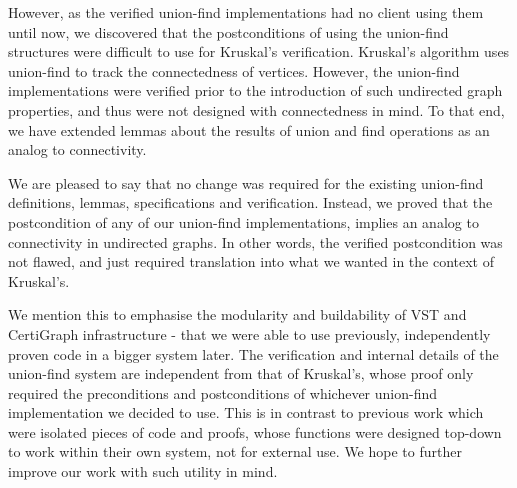 However, as the verified union-find implementations had no client using them until now, we discovered that the postconditions of using the union-find structures were difficult to use for Kruskal's verification. Kruskal's algorithm uses union-find to track the connectedness of vertices. However, the union-find implementations were verified prior to the introduction of such undirected graph properties, and thus were not designed with connectedness in mind. To that end, we have extended lemmas about the results of union and find operations as an analog to connectivity.

We are pleased to say that no change was required for the existing union-find definitions, lemmas, specifications and verification. Instead, we proved that the postcondition of any of our union-find implementations, implies an analog to connectivity in undirected graphs. In other words, the verified postcondition was not flawed, and just required translation into what we wanted in the context of Kruskal's.

We mention this to emphasise the modularity and buildability of VST and CertiGraph infrastructure - that we were able to use previously, independently proven code in a bigger system later. The verification and internal details of the union-find system are independent from that of Kruskal's, whose proof only required the preconditions and postconditions of whichever union-find implementation we decided to use. This is in contrast to previous work which were isolated pieces of code and proofs, whose functions were designed top-down to work within their own system, not for external use. We hope to further improve our work with such utility in mind.
